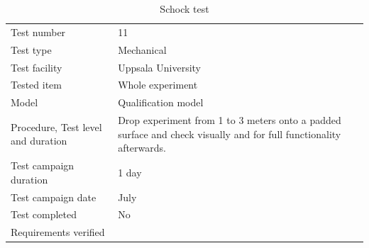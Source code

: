 \documentclass[ %
  a4paper, %
  11pt, %
  openany, %
  parskip, %
  toc=totoc, %
  listof=totoc, %
  bibliography=totoc %
]{scrreprt} %
\providecommand{\DIFaddbeginFL}{} %
\providecommand{\DIFaddendFL}{} %
\providecommand{\DIFdelbeginFL}{} %
\providecommand{\DIFdelendFL}{} %
\providecommand{\DIFscaledelfig}{0.5}
\newlength{\DIFdelgraphicswidth} %
\newlength{\DIFdelgraphicsheight} %
\providecommand{\DIFaddincludegraphics}[2][]{{\color{blue}\fbox{\DIFOincludegraphics[#1]{#2}}}} %
\providecommand{\DIFdelincludegraphics}[2][]{%
\sbox{\DIFdelgraphicsbox}{\DIFOincludegraphics[#1]{#2}}%
\settoboxwidth{\DIFdelgraphicswidth}{\DIFdelgraphicsbox} %
\settoboxtotalheight{\DIFdelgraphicsheight}{\DIFdelgraphicsbox} %
\scalebox{\DIFscaledelfig}{%
\parbox[b]{\DIFdelgraphicswidth}{\usebox{\DIFdelgraphicsbox}\\[-\baselineskip] \rule{\DIFdelgraphicswidth}{0em}}\llap{\resizebox{\DIFdelgraphicswidth}{\DIFdelgraphicsheight}{%
\setlength{\unitlength}{\DIFdelgraphicswidth}%
\begin{picture}(1,1)%
\thicklines\linethickness{2pt} %
{\color[rgb]{1,0,0}\put(0,0){\framebox(1,1){}}}%
{\color[rgb]{1,0,0}\put(0,0){\line( 1,1){1}}}%
{\color[rgb]{1,0,0}\put(0,1){\line(1,-1){1}}}%
\end{picture}%
}\hspace*{3pt}}} %
} %
\DeclareRobustCommand{\DIFaddbeginFL}{\DIFOaddbeginFL \let\includegraphics\DIFaddincludegraphics} %
\DeclareRobustCommand{\DIFaddendFL}{\DIFOaddendFL \let\includegraphics\DIFOincludegraphics} %
\DeclareRobustCommand{\DIFdelbeginFL}{\DIFOdelbeginFL \let\includegraphics\DIFdelincludegraphics} %
\DeclareRobustCommand{\DIFdelendFL}{\DIFOaddendFL \let\includegraphics\DIFOincludegraphics} %
\begin{document}
\begin{table}[H]
\centering
\DIFaddendFL \caption{Schock test}
\DIFdelbeginFL %
\DIFdelendFL \DIFaddbeginFL \label{tab:test_shock}
\begin{tabular}{L{5cm}L{10cm}}
\toprule
Test number & 11 \\
Test type & Mechanical \\
Test facility & Uppsala University \\
Tested item & Whole experiment \\
Model & Qualification model \\
Procedure, Test level and duration & Drop experiment from 1 to 3 meters onto a padded surface and check visually and for full functionality afterwards. \\
Test campaign duration & 1 day \\
Test campaign date & July \\
Test completed & No \\
Requirements verified & \\
\bottomrule
\end{tabular}\DIFaddendFL 
\end{table}
\end{document}
